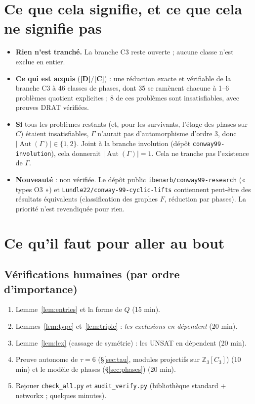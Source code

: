 \documentclass[11pt,a4paper]{article}
\theoremstyle{remark}
\newcommand{\Z}{\mathbb{Z}}
\newcommand{\Aut}{\operatorname{Aut}}
\newcommand{\st}[1]{\textbf{[#1]}}
\newcommand{\code}[1]{\texttt{#1}}
\begin{document}
\section{Ce que cela signifie, et ce que cela ne signifie pas}
\begin{itemize}[nosep]
\item \textbf{Rien n'est tranché.} La branche C3 reste ouverte ; aucune classe n'est exclue en entier.
\item \textbf{Ce qui est acquis} (\st{D}/\st{C}) : une réduction exacte et vérifiable de la branche C3 à 46 classes de phases, dont 35 se ramènent chacune à 1--6
problèmes quotient explicites ; 8 de ces problèmes sont insatisfiables, avec preuves DRAT vérifiées.
\item \textbf{Si} tous les problèmes restants (et, pour les survivants, l'étage des phases sur $C$) étaient insatisfiables, $\Gamma$ n'aurait pas
d'automorphisme d'ordre 3, donc $|\Aut(\Gamma)|\in\{1,2\}$. Joint à la branche involution (dépôt \code{conway99-involution}), cela donnerait
$|\Aut(\Gamma)|=1$. Cela ne tranche pas l'existence de $\Gamma$.
\item \textbf{Nouveauté} : non vérifiée. Le dépôt public \code{ibenarb/conway99-research} (« types O3 ») et \code{Lundle22/conway-99-cyclic-lifts} contiennent
peut-être des résultats équivalents (classification des graphes $F$, réduction par phases). La priorité n'est revendiquée pour rien.
\end{itemize}

\section{Ce qu'il faut pour aller au bout}\label{sec:suite}
\subsection*{Vérifications humaines (par ordre d'importance)}
\begin{enumerate}[nosep]
\item Lemme~\ref{lem:entries} et la forme de $Q$ (15 min).
\item Lemmes~\ref{lem:type} et~\ref{lem:triple} : \emph{les exclusions en dépendent} (20 min).
\item Lemme~\ref{lem:lex} (cassage de symétrie) : les UNSAT en dépendent (20 min).
\item Preuve autonome de $\tau=6$ (§\ref{sec:tau}, modules projectifs sur $\Z_3[C_3]$) (10 min) et le modèle de phases (§\ref{sec:phases}) (20 min).
\item Rejouer \code{check\_all.py} et \code{audit\_verify.py} (bibliothèque standard + networkx ; quelques minutes).
\end{enumerate}
\end{document}
